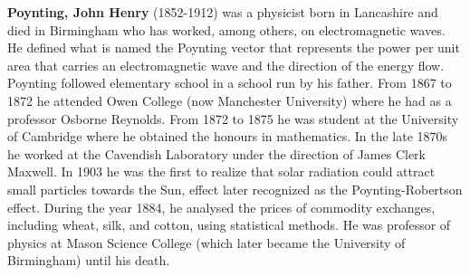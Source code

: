 \textbf{Poynting, John Henry} (1852-1912) was a physicist born in Lancashire and died in Birmingham who has worked, among others, on electromagnetic waves. He defined what is named the Poynting vector that represents the power per unit area that carries an electromagnetic wave and the direction of the energy flow. Poynting followed elementary school in a school run by his father. From 1867 to 1872 he attended  Owen College (now Manchester University) where he had as a professor Osborne Reynolds. From 1872 to 1875 he was student at the University of Cambridge where he obtained the honours in mathematics. In the late 1870s he worked at the Cavendish Laboratory under the direction of James Clerk Maxwell. In 1903 he was the first to realize that solar radiation could attract small particles towards the Sun, effect later recognized as the Poynting-Robertson effect. During the year 1884, he analysed the prices of commodity exchanges, including wheat, silk, and cotton, using statistical methods. He was professor of physics at Mason Science College (which later became the University of Birmingham) until his death.

{}

